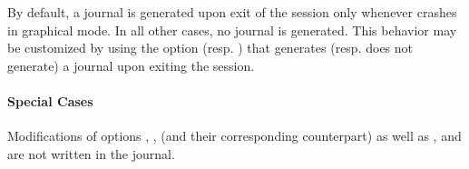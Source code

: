 By default, a journal is generated upon exit of the session only whenever
\FramaC crashes in graphical mode. In all other cases, no journal is
generated. This behavior may be customized by using the option
 (resp. ) that
generates (resp. does not generate) a journal upon exiting the session.

\paragraph{Special Cases}

Modifications of options , ,
\xspace (and their corresponding counterpart) as well as
, \xspace and
\xspace are not written in the journal.
